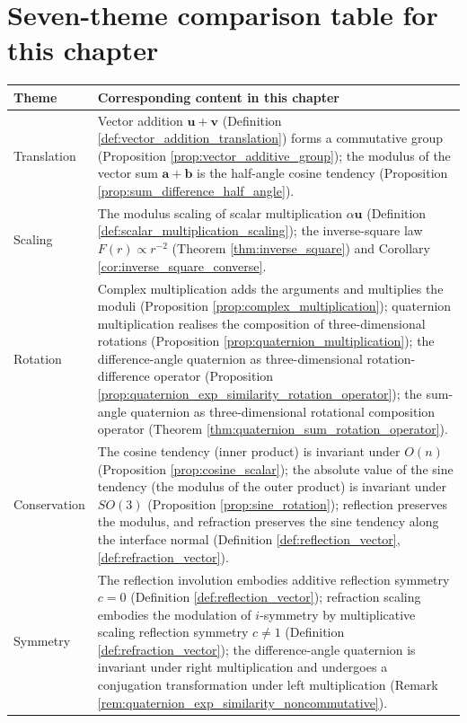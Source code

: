 \section*{Seven-theme comparison table for this chapter}

\begingroup
\begin{longtable}{>{\raggedright\arraybackslash}p{3cm}>{\raggedright\arraybackslash}p{10.5cm}}
\toprule
Theme & Corresponding content in this chapter \\
\midrule
Translation & Vector addition $\mathbf{u}+\mathbf{v}$ (Definition \ref{def:vector_addition_translation}) forms a commutative group (Proposition \ref{prop:vector_additive_group}); the modulus of the vector sum $\mathbf{a}+\mathbf{b}$ is the half-angle cosine tendency (Proposition \ref{prop:sum_difference_half_angle}). \\
Scaling & The modulus scaling of scalar multiplication $\alpha\mathbf{u}$ (Definition \ref{def:scalar_multiplication_scaling}); the inverse-square law $F(r)\propto r^{-2}$ (Theorem \ref{thm:inverse_square}) and Corollary \ref{cor:inverse_square_converse}. \\
Rotation & Complex multiplication adds the arguments and multiplies the moduli (Proposition \ref{prop:complex_multiplication}); quaternion multiplication realises the composition of three-dimensional rotations (Proposition \ref{prop:quaternion_multiplication}); the difference-angle quaternion as three-dimensional rotation-difference operator (Proposition \ref{prop:quaternion_exp_similarity_rotation_operator}); the sum-angle quaternion as three-dimensional rotational composition operator (Theorem \ref{thm:quaternion_sum_rotation_operator}). \\
Conservation & The cosine tendency (inner product) is invariant under $O(n)$ (Proposition \ref{prop:cosine_scalar}); the absolute value of the sine tendency (the modulus of the outer product) is invariant under $SO(3)$ (Proposition \ref{prop:sine_rotation}); reflection preserves the modulus, and refraction preserves the sine tendency along the interface normal (Definition \ref{def:reflection_vector}, \ref{def:refraction_vector}). \\
Symmetry & The reflection involution embodies additive reflection symmetry $c=0$ (Definition \ref{def:reflection_vector}); refraction scaling embodies the modulation of $i$-symmetry by multiplicative scaling reflection symmetry $c\neq 1$ (Definition \ref{def:refraction_vector}); the difference-angle quaternion is invariant under right multiplication and undergoes a conjugation transformation under left multiplication (Remark \ref{rem:quaternion_exp_similarity_noncommutative}). \\

\end{longtable}
